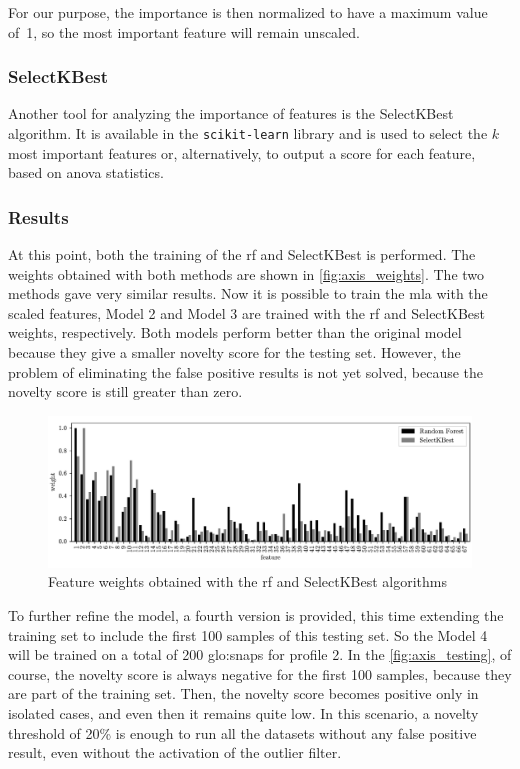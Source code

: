 For our purpose, the importance is then normalized to have a maximum value of~1, so the most important feature will remain unscaled.

\subsubsection{SelectKBest}
Another tool for analyzing the importance of features is the SelectKBest algorithm. It is available in the \texttt{scikit-learn} library and is used to select the $k$ most important features or, alternatively, to output a score for each feature, based on \gls{anova} statistics.

\subsubsection{Results}
At this point, both the training of the \gls{rf} and SelectKBest is performed. The weights obtained with both methods are shown in \autoref{fig:axis_weights}. The two methods gave very similar results. Now it is possible to train the \gls{mla} with the scaled features, Model 2 and Model 3 are trained with the \gls{rf} and SelectKBest weights, respectively. Both models perform better than the original model because they give a smaller novelty score for the testing set. However, the problem of eliminating the false positive results is not yet solved, because the novelty score is still greater than zero.

\begin{figure}
    \centering
    \includegraphics[width=\textwidth]{images/LinearMotor/Feat_weights.pdf}
    \caption{Feature weights obtained with the \gls{rf} and SelectKBest algorithms}
    \label{fig:axis_weights}
\end{figure}

To further refine the model, a fourth version is provided, this time extending the training set to include the first 100 samples of this testing set. So the Model 4 will be trained on a total of 200 \gls{glo:snap}s for profile 2. In the \autoref{fig:axis_testing}, of course, the novelty score is always negative for the first 100 samples, because they are part of the training set. Then, the novelty score becomes positive only in isolated cases, and even then it remains quite low. In this scenario, a novelty threshold of 20\% is enough to run all the datasets without any false positive result, even without the activation of the outlier filter.

